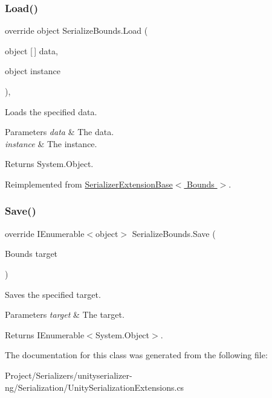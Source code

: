 \subsubsection{\texorpdfstring{Load()}{Load()}}
{\footnotesize\ttfamily override object Serialize\+Bounds.\+Load (\begin{DoxyParamCaption}\item[{object \mbox{[}$\,$\mbox{]}}]{data,  }\item[{object}]{instance }\end{DoxyParamCaption})\hspace{0.3cm}{\ttfamily [inline]}, {\ttfamily [virtual]}}



Loads the specified data. 


\begin{DoxyParams}{Parameters}
{\em data} & The data.\\
\hline
{\em instance} & The instance.\\
\hline
\end{DoxyParams}
\begin{DoxyReturn}{Returns}
System.\+Object.
\end{DoxyReturn}


Reimplemented from \hyperlink{class_serializer_extension_base_a3792a9b27056e30ca0ac91531936ae47}{Serializer\+Extension\+Base$<$ Bounds $>$}.

\mbox{\label{class_serialize_bounds_a1bb554ee48efe17ae70c846ff86cbc13}} 
\subsubsection{\texorpdfstring{Save()}{Save()}}
{\footnotesize\ttfamily override I\+Enumerable$<$object$>$ Serialize\+Bounds.\+Save (\begin{DoxyParamCaption}\item[{Bounds}]{target }\end{DoxyParamCaption})\hspace{0.3cm}{\ttfamily [inline]}}



Saves the specified target. 


\begin{DoxyParams}{Parameters}
{\em target} & The target.\\
\hline
\end{DoxyParams}
\begin{DoxyReturn}{Returns}
I\+Enumerable$<$System.\+Object$>$.
\end{DoxyReturn}


The documentation for this class was generated from the following file\+:\begin{DoxyCompactItemize}
\item 
Project/\+Serializers/unityserializer-\/ng/\+Serialization/Unity\+Serialization\+Extensions.\+cs\end{DoxyCompactItemize}
